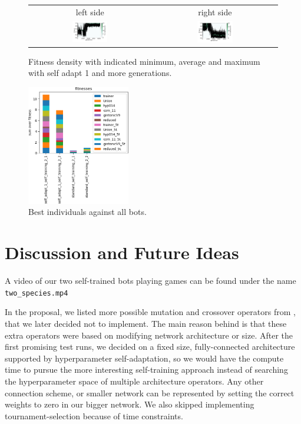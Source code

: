 \documentclass[11pt,a4paper]{scrartcl}
\begin{document}
\begin{figure}[H]
\center
\begin{tabular}{cc}
left side & right side \\
\includegraphics[width=0.3\textwidth]{img/self_adapt_1_self_training_2_1.png} &
\includegraphics[width=0.3\textwidth]{img/self_adapt_1_self_training_2_2.png} \\
\end{tabular}
\caption{Fitness density with indicated minimum, average and maximum with self adapt 1 and more generations.}
\label{fig:self_adapt1_self_training_2}
\end{figure}

\begin{figure}[H]
\center
\includegraphics[width=0.4\textwidth]{img/self_training_2.png}
\caption{Best individuals against all bots.}
\label{fig:self_training_2}
\end{figure}

\section{Discussion and Future Ideas}

A video of our two self-trained bots playing games can be found under the name \texttt{two\_species.mp4}

In the proposal, we listed more possible mutation and crossover operators from \cite{montana1989training}, that we later decided not to implement. The main reason behind is that these extra operators were based on modifying network architecture or size. After the first promising test runs, we decided on a fixed size, fully-connected architecture supported by hyperparameter self-adaptation, so we would have the compute time to pursue the more interesting self-training approach instead of searching the hyperparameter space of multiple architecture operators. Any other connection scheme, or smaller network can be represented by setting the correct weights to zero in our bigger network. We also skipped implementing tournament-selection because of time constraints.
\end{document}
